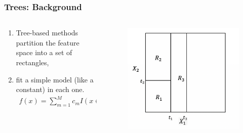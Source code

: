 \documentclass[
  shownotes,
  xcolor={svgnames},
  hyperref={colorlinks,citecolor=DarkBlue,linkcolor=DarkRed,urlcolor=DarkBlue}
  ]{beamer}
\begin{document}
\begin{frame}[fragile]
\frametitle{Trees: Background}


\begin{columns}[T] %
\begin{column}{.42\textwidth}
  
\begin{enumerate}
\item Tree-based methods partition the feature space into a set of rectangles,
\item  fit a simple model (like a constant) in each one. 
\begin{align}
f(x) = \sum_{m=1}^M c_m I(x\in R_m)
\end{align}
\end{enumerate}


\end{column}  
\hfill
\begin{column}{.48\textwidth}

 \begin{figure}[H] \centering
            \captionsetup{justification=centering}
              \includegraphics[scale=0.4]{figures/cart_4}                           
 \end{figure}

\end{column}
\end{columns}
\end{frame}
\end{document}
